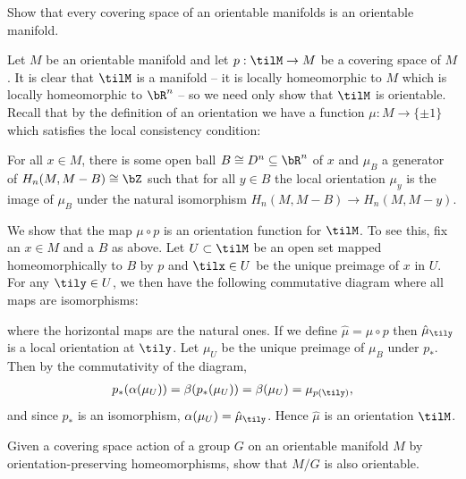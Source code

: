 \begin{homework}[e]
   Show that every covering space of an orientable manifolds is an orientable manifold.
  \begin{prf}
    Let $M$ be an orientable manifold and let $p:\tilM\to M$ be a covering space of $M$. It is clear that $\tilM$ is a manifold -- it is locally homeomorphic to $M$ which is locally homeomorphic to $\bR^n$ -- so we need only show that $\tilM$ is orientable. Recall that by the definition of an orientation we have a function $\mu:M\to \{\pm 1\}$ which satisfies the local consistency condition:
    \begin{center}
      For all $x \in M$, there is some open ball $B \cong D^n \subseteq \bR^n$ of $x$ and $\mu_B$ a generator of $H_n(M, M - B)\cong \bZ$ such that for all $y \in B$ the local orientation $\mu_y$ is the image of $\mu_B$ under the natural isomorphism $H_n(M,M-B)\to H_n(M,M - y)$.
    \end{center}
    We show that the map $\mu \circ p$ is an orientation function for $\tilM$. To see this, fix an $x \in M$ and a $B$ as above. Let $U \subset \tilM$ be an open set mapped homeomorphically to $B$ by $p$ and $\tilx \in U$ be the unique preimage of $x$ in $U$. For any $\tily \in U$, we then have the following commutative diagram where all maps are isomorphisms:
    \begin{center}
    \end{center}
    where the horizontal maps are the natural ones. If we define $\hat{\mu} = \mu\circ p$ then $\hat{\mu}_{\tily}$ is a local orientation at $\tily$. Let $\mu_U$ be the unique preimage of $\mu_B$ under $p_*$. Then by the commutativity of the diagram,
    \begin{align*}
      p_*(\alpha(\mu_U)) = \beta(p_*(\mu_U)) = \beta(\mu_U) = \mu_{p(\tily)},
    \end{align*}
    and since $p_*$ is an isomorphism, $\alpha(\mu_U) = \hat{\mu}_{\tily}$. Hence $\hat{\mu}$ is an orientation $\tilM$.
  \end{prf}
   Given a covering space action of a group $G$ on an orientable manifold $M$ by orientation-preserving homeomorphisms, show that $M/G$ is also orientable.

\end{homework}
